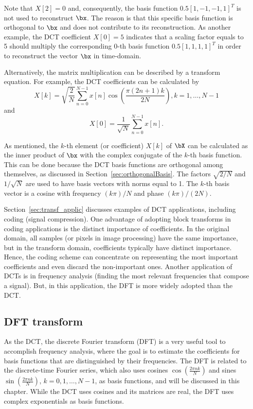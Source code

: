 Note that $X[2]=0$ and, consequently, the basis function $0.5[1,-1,-1,1]^T$ is not used to reconstruct $\bx$. The reason is that this specific basis function is orthogonal to $\bx$ and does not contribute to its reconstruction.
As another example, the DCT coefficient $X[0]=5$ indicates that a scaling factor equals to 5 should multiply the corresponding $0$-th basis function $0.5[1,1,1,1]^T$ in order to reconstruct the vector $\bx$ in time-domain.
\eExample

Alternatively, the matrix multiplication can be described by a transform equation. For example, the DCT coefficients can be calculated by
\[
X[k] = \sqrt{\frac{2}{N}} \sum_{n=0}^{N-1} x[n] \cos \left( \frac{\pi (2 n + 1) k}{2N}  \right), k=1,\ldots,N-1
\]
and
\[
X[0] = \frac{1}{\sqrt{N}} \sum_{n=0}^{N-1} x[n].
\]

As mentioned, the $k$-th element (or coefficient) $X[k]$ of $\bX$ can be calculated as the inner product of $\bx$ with the complex conjugate of the $k$-th basis function. This can be done because the DCT basis functions are orthogonal among themselves, as discussed in Section~\ref{sec:orthogonalBasis}.
The factors $\sqrt{2/N}$ and $1/\sqrt{N}$ are used to have basis vectors with norms equal to 1.
The $k$-th basis vector is a cosine with frequency $(k\pi)/N$ and phase $(k \pi)/ (2N)$.

Section~\ref{sec:transf_applic} discusses examples of DCT applications, including coding (signal compression).
One advantage of adopting block transforms in coding applications is the distinct importance of coefficients. In the original domain, all samples (or pixels in image processing) have the same importance, but in the transform domain, coefficients typically have distinct importance. Hence, the coding scheme can concentrate on representing the most important coefficients and even discard the non-important ones.
Another application of DCTs is in frequency analysis (finding the most relevant frequencies that compose a signal). But, in this application, the DFT is more 
widely adopted than the DCT.

\subsection{DFT transform}

As the DCT, the discrete Fourier transform (DFT) is a very useful tool to accomplish frequency analysis, where the goal is to estimate the coefficients for basis functions that are distinguished by their frequencies. The DFT is related to the discrete-time Fourier series,
which also uses cosines $\cos \left(\frac {2\pi nk} N \right)$ and sines $\sin \left(\frac {2\pi nk} N \right)$,  $k=0,1,\ldots,N-1$, as basis functions, and will be discussed in this chapter. While the DCT uses cosines and its matrices are real, the DFT uses complex exponentials as basis functions.

